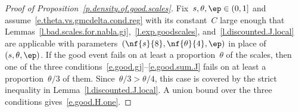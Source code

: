 \documentclass[11pt]{amsart}
\begin{document}
\begin{proof}[{Proof of Proposition~\ref{p.density.of.good.scales}}]
Fix~$s,\theta,\ep\in(0,1]$ and assume~\eqref{e.theta.vs.gmcdelta.cond.reg} with its constant~$C$ large enough that Lemmas~\ref{l.bad.scales.for.nabla.gj},~\ref{l.exp.goodscales}, and~\ref{l.discounted.J.local} are applicable with parameters~$(\nf{s}{8},\nf{\theta}{4},\ep)$ in place of~$(s,\theta,\ep)$. If the good event fails on at least a proportion~$\theta$ of the scales, then one of the three conditions~\eqref{e.good.gj}--\eqref{e.good.sum.J} fails on at least a proportion~$\theta/3$ of them. Since~$\theta/3>\theta/4$, this case is covered by the strict inequality in Lemma~\ref{l.discounted.J.local}. A union bound over the three conditions gives~\eqref{e.good.H.one}.
\end{proof}
\end{document}
